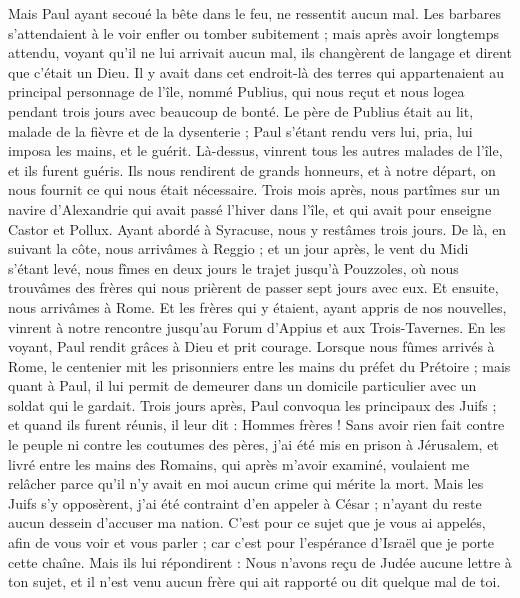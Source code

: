 \begin{multicols}{2}
Mais Paul ayant secoué la bête dans le feu, ne ressentit aucun mal.
Les barbares s’attendaient à le voir enfler ou tomber subitement ; mais après avoir longtemps attendu, voyant qu’il ne lui arrivait aucun mal, ils changèrent de langage et dirent que c’était un Dieu.
Il y avait dans cet endroit-là des terres qui appartenaient au principal personnage de l'île, nommé Publius, qui nous reçut et nous logea pendant trois jours avec beaucoup de bonté.
Le père de Publius était au lit, malade de la fièvre et de la dysenterie ; Paul s’étant rendu vers lui, pria, lui imposa les mains, et le guérit.
Là-dessus, vinrent tous les autres malades de l'île, et ils furent guéris.
Ils nous rendirent de grands honneurs, et à notre départ, on nous fournit ce qui nous était nécessaire.
Trois mois après, nous partîmes sur un navire d'Alexandrie qui avait passé l’hiver dans l'île, et qui avait pour enseigne Castor et Pollux.
Ayant abordé à Syracuse, nous y restâmes trois jours.
De là, en suivant la côte, nous arrivâmes à Reggio ; et un jour après, le vent du Midi s'étant levé, nous fîmes en deux jours le trajet jusqu’à Pouzzoles,
où nous trouvâmes des frères qui nous prièrent de passer sept jours avec eux. Et ensuite, nous arrivâmes à Rome.
Et les frères qui y étaient, ayant appris de nos nouvelles, vinrent à notre rencontre jusqu’au Forum d'Appius et aux Trois-Tavernes. En les voyant, Paul rendit grâces à Dieu et prit courage.
Lorsque nous fûmes arrivés à Rome, le centenier mit les prisonniers entre les mains du préfet du Prétoire ; mais quant à Paul, il lui permit de demeurer dans un domicile particulier avec un soldat qui le gardait.
Trois jours après, Paul convoqua les principaux des Juifs ; et quand ils furent réunis, il leur dit : Hommes frères ! Sans avoir rien fait contre le peuple ni contre les coutumes des pères, j'ai été mis en prison à Jérusalem, et livré entre les mains des Romains,
qui après m'avoir examiné, voulaient me relâcher parce qu'il n'y avait en moi aucun crime qui mérite la mort.
Mais les Juifs s'y opposèrent, j'ai été contraint d'en appeler à César ; n’ayant du reste aucun dessein d'accuser ma nation.
C’est pour ce sujet que je vous ai appelés, afin de vous voir et vous parler ; car c'est pour l'espérance d'Israël que je porte cette chaîne.
Mais ils lui répondirent : Nous n'avons reçu de Judée aucune lettre à ton sujet, et il n’est venu aucun frère qui ait rapporté ou dit quelque mal de toi.

\end{multicols}
